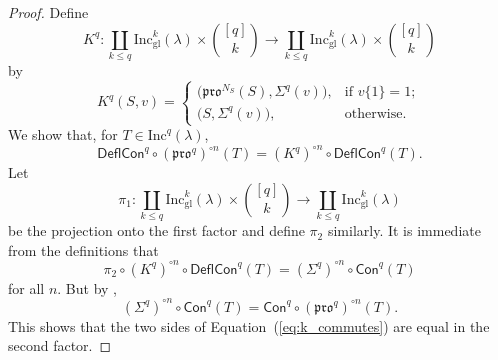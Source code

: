 \documentclass[12pt]{amsart}
\theoremstyle{definition}
\theoremstyle{remark}
\numberwithin{equation}{section}
\newcommand{\inc}{\ensuremath{\mathrm{Inc}}}
\newcommand{\incgl}{\inc_{\mathrm{gl}}}
\newcommand{\pro}{\mathfrak{pro}}
\newcommand{\content}{\ensuremath{\mathsf{Con}}}
\newcommand{\compress}{\ensuremath{\mathsf{DeflCon}}}
\begin{document}
  \begin{proof}
Define
  \[
  K^q: \coprod_{k \leq q}\incgl^k(\lambda) \times \binom{[q]}{k} \rightarrow \coprod_{k \leq q}\incgl^k(\lambda) \times \binom{[q]}{k}
  \] by
\[
K^q(S,v) =
\begin{cases}
    \big( \pro^{N_S}(S),\Sigma^q(v) \big),  & \text{if } v\{1\} = 1; \\        
   \big( S,\Sigma^q(v) \big), & \text{otherwise.}
\end{cases}
\]
We show that, for $T \in \inc^q(\lambda)$,
\begin{equation}\label{eq:k_commutes}
\compress^q \circ (\pro^q)^{\circ n}(T) = (K^q)^{\circ n} \circ \compress^q(T).
\end{equation}
Let \[ \pi_1: \coprod_{k \leq q}\incgl^k(\lambda) \times \binom{[q]}{k} \rightarrow \coprod_{k \leq q} \incgl^k(\lambda) \] be the projection onto the first factor and define $\pi_2$ similarly. It is immediate from the definitions that \[ \pi_2 \circ (K^q)^{\circ n} \circ \compress^q(T) = (\Sigma^q)^{\circ n} \circ \content^q(T)\] for all $n$. But by \cite[Lemma~2.1]{DPS},
\[  (\Sigma^q)^{\circ n} \circ \content^q(T) = \content^q \circ (\pro^q)^{\circ n} (T).\] This shows that the two sides of Equation~(\ref{eq:k_commutes}) are equal in the second factor.  


\end{proof}
\end{document}
